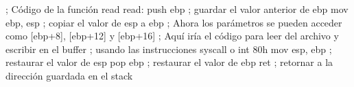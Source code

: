 \documentclass[../main.tex]{subfiles}
\begin{document}
; Código de la función read read: push ebp ; guardar el valor anterior de ebp mov ebp, esp ; copiar el valor de esp a ebp ; Ahora los parámetros se pueden acceder como [ebp+8], [ebp+12] y [ebp+16] ; Aquí iría el código para leer del archivo y escribir en el buffer ; usando las instrucciones syscall o int 80h mov esp, ebp ; restaurar el valor de esp pop ebp ; restaurar el valor de ebp ret ; retornar a la dirección guardada en el stack
\end{document}
